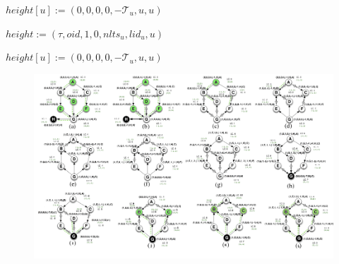 \begin{algorithm}
	\caption{$ELECTSELF$}
	\begin{algorithmic}
		\State $height[u] := (0,0,0,0,-\mathcal{T}_u ,u,u)$
	\end{algorithmic}
\end{algorithm}

\begin{algorithm}
	\caption{$\mathtt{REFLECTREFLEVEL}$}
	\begin{algorithmic}
		\State $height := (\tau, oid, 1, 0, nlts_u ,lid_u ,u)$
	\end{algorithmic}
\end{algorithm}
\begin{algorithm}
	\caption{$ELECTSELF$}
	\begin{algorithmic}
		\State $height[u] := (0,0,0,0,-\mathcal{T}_u ,u,u)$
	\end{algorithmic}
\end{algorithm}

\newpage
\begin{landscape}
\begin{figure}
	\centering
	\includegraphics[width=1\linewidth]{test_1}
	\caption{}
	\label{fig:test1}
\end{figure}

\end{landscape}